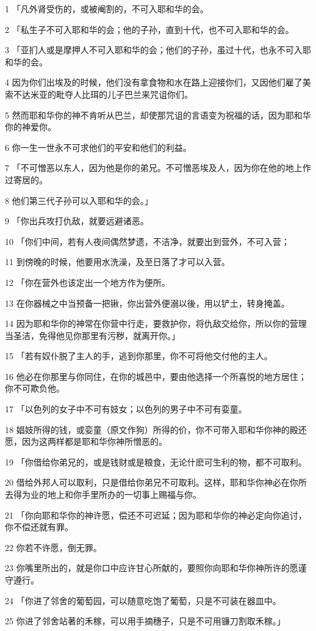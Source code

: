 \par 1 「凡外肾受伤的，或被阉割的，不可入耶和华的会。
\par 2 「私生子不可入耶和华的会；他的子孙，直到十代，也不可入耶和华的会。
\par 3 「亚扪人或是摩押人不可入耶和华的会；他们的子孙，虽过十代，也永不可入耶和华的会。
\par 4 因为你们出埃及的时候，他们没有拿食物和水在路上迎接你们，又因他们雇了美索不达米亚的毗夺人比珥的儿子巴兰来咒诅你们。
\par 5 然而耶和华你的神不肯听从巴兰，却使那咒诅的言语变为祝福的话，因为耶和华你的神爱你。
\par 6 你一生一世永不可求他们的平安和他们的利益。
\par 7 「不可憎恶以东人，因为他是你的弟兄。不可憎恶埃及人，因为你在他的地上作过寄居的。
\par 8 他们第三代子孙可以入耶和华的会。」
\par 9 「你出兵攻打仇敌，就要远避诸恶。
\par 10 「你们中间，若有人夜间偶然梦遗，不洁净，就要出到营外，不可入营；
\par 11 到傍晚的时候，他要用水洗澡，及至日落了才可以入营。
\par 12 「你在营外也该定出一个地方作为便所。
\par 13 在你器械之中当预备一把锹，你出营外便溺以後，用以铲土，转身掩盖。
\par 14 因为耶和华你的神常在你营中行走，要救护你，将仇敌交给你，所以你的营理当圣洁，免得他见你那里有污秽，就离开你。」
\par 15 「若有奴仆脱了主人的手，逃到你那里，你不可将他交付他的主人。
\par 16 他必在你那里与你同住，在你的城邑中，要由他选择一个所喜悦的地方居住；你不可欺负他。
\par 17 「以色列的女子中不可有妓女；以色列的男子中不可有娈童。
\par 18 娼妓所得的钱，或娈童（原文作狗）所得的价，你不可带入耶和华你神的殿还愿，因为这两样都是耶和华你神所憎恶的。
\par 19 「你借给你弟兄的，或是钱财或是粮食，无论什麽可生利的物，都不可取利。
\par 20 借给外邦人可以取利，只是借给你弟兄不可取利。这样，耶和华你神必在你所去得为业的地上和你手里所办的一切事上赐福与你。
\par 21 「你向耶和华你的神许愿，偿还不可迟延；因为耶和华你的神必定向你追讨，你不偿还就有罪。
\par 22 你若不许愿，倒无罪。
\par 23 你嘴里所出的，就是你口中应许甘心所献的，要照你向耶和华你神所许的愿谨守遵行。
\par 24 「你进了邻舍的葡萄园，可以随意吃饱了葡萄，只是不可装在器皿中。
\par 25 你进了邻舍站著的禾稼，可以用手摘穗子，只是不可用镰刀割取禾稼。」

